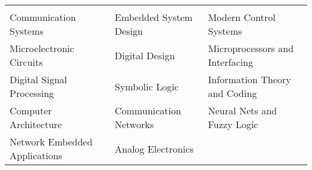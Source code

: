  {} 
\begin{center}
\begin{tabularx}{\textwidth}{X|X|X}
\multicolumn{3}{c}{}\\
Communication Systems     &  Embedded System Design  & Modern Control Systems   \\
Microelectronic Circuits   & Digital Design & Microprocessors and Interfacing  \\
Digital Signal Processing & Symbolic Logic  & Information Theory and Coding \\
Computer Architecture  & Communication Networks & Neural Nets and Fuzzy Logic  \\
Network Embedded Applications & Analog Electronics &  \\

\end{tabularx}
\end{center}